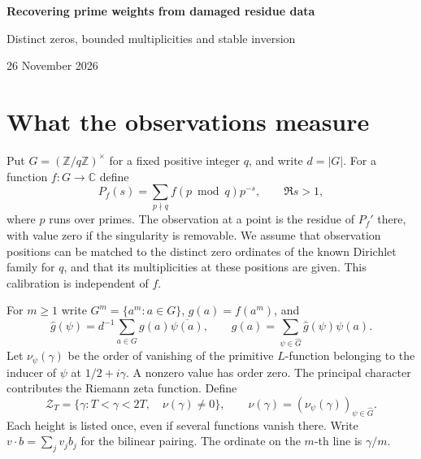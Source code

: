 \documentclass[11pt]{article}
\newcommand{\Z}{\mathbb Z}
\newcommand{\C}{\mathbb C}
\begin{document}
\begin{center}
{\LARGE\bfseries Recovering prime weights from damaged residue data\par}
\vspace{5pt}
{\large Distinct zeros, bounded multiplicities and stable inversion}\par
\vspace{5pt}
26 November 2026
\end{center}
\begin{abstract}
Let $f$ assign a complex weight to each reduced residue class modulo $q$.
On the line $\Re s=1/(2m)$, the derivative of its prime Dirichlet series encodes the restriction of $f$ to the $m$-th powers when $m$ is squarefree.
We prove that a positive fraction of the observations in every sufficiently high dyadic block can be arbitrarily corrupted while this restriction remains recoverable. Bounded errors at the other observations give bounded reconstruction error, uniformly in height.
The arithmetic input is a density theorem: every nonzero complex combination of Dirichlet zero multiplicities has size comparable to its coefficient norm at $\gg_q T\log T$ distinct ordinates in $(T,2T)$ of bounded total multiplicity. A single integer matrix suffices for recovery. Each of its rows recurs at a positive fraction of all candidate ordinates.
\end{abstract}

\section{What the observations measure}
Put $G=(\Z/q\Z)^\times$ for a fixed positive integer $q$, and write $d=|G|$. For a function $f:G\to\C$ define
\begin{equation}\label{eq:prime}
 P_f(s)=\sum_{p\nmid q}f(p\bmod q)p^{-s},
 \qquad \Re s>1,
\end{equation}
where $p$ runs over primes. The observation at a point is the residue of $P_f'$ there, with value zero if the singularity is removable. We assume that observation positions can be matched to the distinct zero ordinates of the known Dirichlet family for $q$, and that its multiplicities at these positions are given. This calibration is independent of $f$.

For $m\ge1$ write $G^m=\{a^m:a\in G\}$, $g(a)=f(a^m)$, and
\[
 \widehat g(\psi)=d^{-1}\sum_{a\in G}g(a)\overline{\psi(a)},\qquad
 g(a)=\sum_{\psi\in\widehat G}\widehat g(\psi)\psi(a).
\]
Let $\nu_\psi(\gamma)$ be the order of vanishing of the primitive $L$-function belonging to the inducer of $\psi$ at $1/2+i\gamma$. A nonzero value has order zero. The principal character contributes the Riemann zeta function. Define
\[
 \mathcal Z_T=\{\gamma:T<\gamma<2T,\quad \nu(\gamma)\ne0\},
 \qquad \nu(\gamma)=(\nu_\psi(\gamma))_{\psi\in\widehat G}.
\]
Each height is listed once, even if several functions vanish there.
Write $v\cdot b=\sum_j v_j b_j$ for the bilinear pairing.
The ordinate on the $m$-th line is $\gamma/m$.
\end{document}
